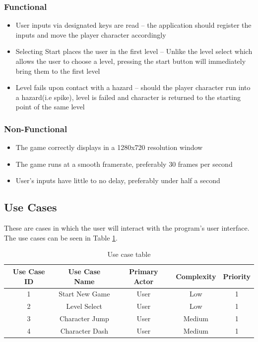 \documentclass[10pt,conference,onecolumn,compsoc]{IEEEtran}
\begin{document}
\subsubsection{Functional}
\begin{itemize}
\item User inputs via designated keys are read – the application should register the inputs and move the player character accordingly
\item Selecting Start places the user in the first level – Unlike the level select which allows the user to choose a level, pressing the start button will immediately bring them to the first level
\item Level fails upon contact with a hazard – should the player character run into a hazard(i.e spike), level is failed and character is returned to the starting point of the same level
\end{itemize}

\subsubsection{Non-Functional}
\begin{itemize}
\item The game correctly displays in a 1280x720 resolution window
\item The game runs at a smooth framerate, preferably 30 frames per second
\item User's inputs have little to no delay, preferably under half a second
\end{itemize}

\subsection{Use Cases}
These are cases in which the user will interact with the program's user interface. The use cases can be seen in Table \ref{tab:useCaseIndex}.




\begin{table}
\centering
\begin{tabular}{|c|c|c|c|c|}
\hline
Use Case ID & Use Case Name & Primary Actor & Complexity & Priority \\
\hline \hline
1 & Start New Game & User & Low & 1\\
\hline
2 & Level Select & User & Low & 1\\
\hline
3 & Character Jump & User & Medium & 1\\
\hline
4 & Character Dash & User & Medium & 1\\

\end{tabular}
\caption{Use case table}
\label{tab:useCaseIndex}
\end{table}
\end{document}
